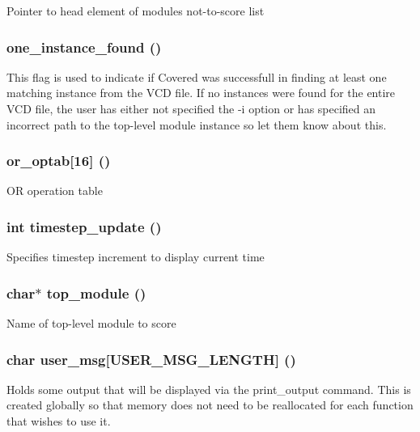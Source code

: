 Pointer to head element of modules not-to-score list 
\subsubsection{ {\bf one\_\-instance\_\-found} ()}\label{db_8c_a7}


This flag is used to indicate if Covered was successfull in finding at least one matching instance from the VCD file. If no instances were found for the entire VCD file, the user has either not specified the -i option or has specified an incorrect path to the top-level module instance so let them know about this. 
\subsubsection{ {\bf or\_\-optab}[16] ()}\label{db_8c_a5}


OR operation table 
\subsubsection{\setlength{\rightskip}{0pt plus 5cm}int {\bf timestep\_\-update} ()}\label{db_8c_a10}


Specifies timestep increment to display current time 
\subsubsection{\setlength{\rightskip}{0pt plus 5cm}char$\ast$ {\bf top\_\-module} ()}\label{db_8c_a0}


Name of top-level module to score 
\subsubsection{\setlength{\rightskip}{0pt plus 5cm}char {\bf user\_\-msg}[USER\_\-MSG\_\-LENGTH] ()}\label{db_8c_a6}


Holds some output that will be displayed via the print\_\-output command. This is created globally so that memory does not need to be reallocated for each function that wishes to use it. 
